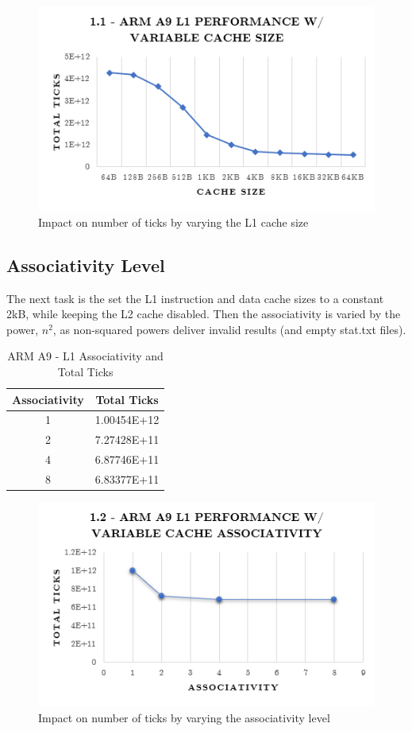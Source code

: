 \documentclass[a4paper, 10pt, conference]{ieeeconf}      %
\begin{document}
\begin{figure}[thpb]
\centering
\includegraphics[scale=.5]{ex1_1.png}
\caption{Impact on number of ticks by varying the L1 cache size}
\label{figurelabel}
\end{figure}

\subsection{Associativity Level}

The next task is the set the L1 instruction and data cache sizes to a constant 2kB, while keeping the L2 cache disabled. Then the associativity is varied by the power, $n^2$, as non-squared powers deliver invalid results (and empty stat.txt files). 

\begin{table}[h]
\caption{ARM A9 - L1 Associativity and Total Ticks}
\label{table_example}
\begin{center}
\begin{tabular}{|c||c|}
\hline
Associativity & Total Ticks\\
\hline
1 & 1.00454E+12\\
\hline
2 & 7.27428E+11\\
\hline
4 & 6.87746E+11\\
\hline
8 & 6.83377E+11
\\
\hline
\end{tabular}
\end{center}
\end{table}


\begin{figure}[thpb]
\centering
\includegraphics[scale=.5]{ex1_2.png}
\caption{Impact on number of ticks by varying the associativity level}
\label{figurelabel}
\end{figure}
\end{document}
